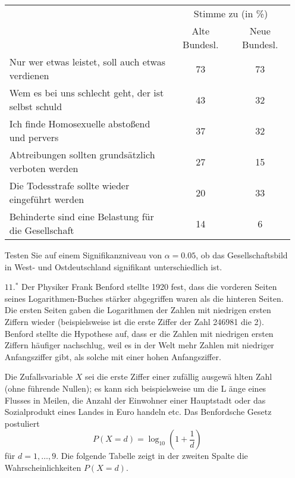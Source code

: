 \documentclass{article}
\begin{document}
\begin{enumerate}
\begin{center}%
\begin{tabular}{|l|c|c|}
\hline
& \multicolumn{2}{|c|}{Stimme zu (in \%)} \\ 
& Alte Bundesl. & Neue Bundesl. \\ \hline
Nur wer etwas leistet, soll auch etwas verdienen & 73 & 73 \\ \hline
Wem es bei uns schlecht geht, der ist selbst schuld & 43 & 32 \\ \hline
Ich finde Homosexuelle absto\ss end und pervers & 37 & 32 \\ \hline
Abtreibungen sollten grunds\"{a}tzlich verboten werden & 27 & 15 \\ \hline
Die Todesstrafe sollte wieder eingef\"{u}hrt werden & 20 & 33 \\ \hline
Behinderte sind eine Belastung f\"{u}r die Gesellschaft & 14 & 6 \\ \hline
\end{tabular}%
\end{center}%

Testen Sie auf einem Signifikanzniveau von $\alpha =0.05$, ob das
Gesellschaftsbild in West- und Ostdeutschland signifikant unterschiedlich
ist.

\item[$11.^{\ast }$] Der Physiker Frank Benford stellte 1920 fest, dass die
vorderen Seiten seines Logarithmen-Buches st\"{a}rker abgegriffen waren als
die hinteren Seiten. Die ersten Seiten gaben die Logarithmen der Zahlen mit
niedrigen ersten Ziffern wieder (beispielsweise ist die erste Ziffer der
Zahl 246981 die 2). Benford stellte die Hypothese auf, dass er die Zahlen
mit niedrigen ersten Ziffern h\"{a}ufiger nachschlug, weil es in der Welt
mehr Zahlen mit niedriger Anfangs\-ziffer gibt, als solche mit einer hohen
Anfangsziffer.

Die Zufallsvariable $X$ sei die erste Ziffer einer zuf\"{a}llig ausgew\"{a}%
hlten Zahl (ohne f\"{u}hrende Nullen); es kann sich beispielsweise um die L%
\"{a}nge eines Flusses in Meilen, die Anzahl der Einwohner einer Hauptstadt
oder das Sozialprodukt eines Landes in Euro handeln etc. Das Benfordsche
Gesetz postuliert 
\begin{equation*}
P\left( X=d\right) =\log _{10}\left( 1+\frac{1}{d}\right)
\end{equation*}%
f\"{u}r $d=1,\ldots ,9$. Die folgende Tabelle zeigt in der zweiten Spalte
die Wahrscheinlichkeiten $P\left( X=d\right) $.


\end{enumerate}
\end{document}
